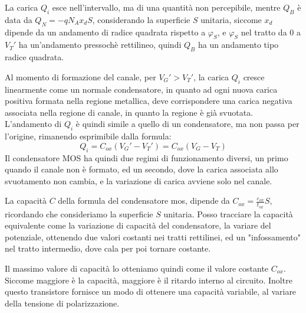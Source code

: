 \documentclass[../template]{subfiles}
\begin{document}
La carica $Q_i$ esce nell'intervallo, ma di una quantità non percepibile, mentre $Q_B$ è data da
$Q_N = -q N_A x_d S$, considerando la superficie $S$ unitaria, siccome $x_d$ dipende da un andamento di radice quadrata rispetto a $\varphi_S$, e $\varphi_S$ nel tratto da 0 a $V_T'$ ha un'andamento pressochè rettilineo, quindi $Q_B$ ha un andamento tipo radice quadrata.

Al momento di formazione del canale, per $V_G' > V_T'$, la carica $Q_i$ cresce linearmente come un normale condensatore, in quanto ad ogni nuova carica positiva formata nella regione metallica, deve corrispondere una carica negativa associata nella regione di canale, in quanto la regione è già svuotata.
L'andamento di $Q_i$ è quindi simile a quello di un condensatore, ma non passa per l'origine, rimanendo esprimibile dalla formula:
\[
    Q_i = C_{ox}(V_G' - V_T') = C_{ox} (V_G - V_T)
\]
Il condensatore MOS ha quindi due regimi di funzionamento diversi, un primo quando il canale non è formato, ed un secondo, dove la carica associata allo svuotamento non cambia, e la variazione di carica avviene solo nel canale.


La capacità $C$ della formula del condensatore mos, dipende da $C_{ox} = \frac{\varepsilon_{ox}}{t_{ox}}S$, ricordando che consideriamo la superficie $S$ unitaria.
Posso tracciare la capacità equivalente come la variazione di capacità del condensatore, la variare del potenziale, ottenendo due valori costanti nei tratti rettilinei, ed un "infossamento" nel tratto intermedio, dove cala per poi tornare costante.

Il massimo valore di capacità lo otteniamo quindi come il valore costante $C_{ox}$. Siccome maggiore è la capacità, maggiore è il ritardo interno al circuito.
Inoltre questo transistore fornisce un modo di ottenere una capacità variabile, al variare della tensione di polarizzazione.
\end{document}
